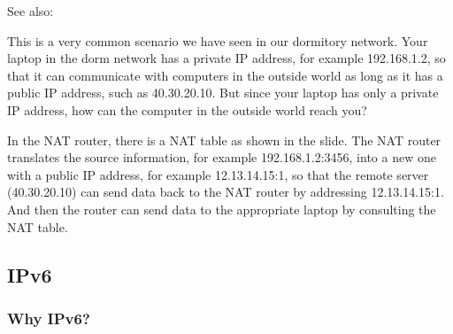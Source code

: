 See also: 

This is a very common scenario we have seen in our dormitory network. Your laptop in the
dorm network has a private IP address, for example 192.168.1.2, so that it can communicate with computers in the outside
world as long as it has a public IP address, such as 40.30.20.10. But since your laptop
has only a private IP address, how can the computer in the outside world reach you?

In the NAT router, there is a NAT table as shown in the slide. The NAT router translates
the source information, for example 192.168.1.2:3456, into a new one with a public IP
address, for example 12.13.14.15:1, so that the remote server (40.30.20.10) can send data
back to the NAT router by addressing 12.13.14.15:1. And then the router can send data to
the appropriate laptop by consulting the NAT table.

\subsection{IPv6}

\subsubsection{Why IPv6?}
  



